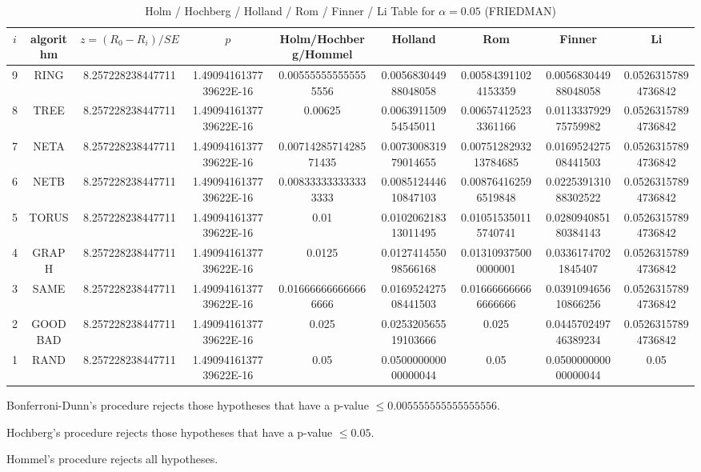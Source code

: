 \documentclass[a4paper,10pt]{article}
\begin{document}
\begin{landscape}
\begin{table}[!htp]
\begin{tabular}{
|r|r|r|r|r|r|r|r|r|r|r|}
\end{tabular}
\end{table}

\newpage

\begin{table}[!htp]
\centering\scriptsize
\caption{Holm / Hochberg / Holland / Rom / Finner / Li Table for $\alpha=0.05$ (FRIEDMAN)}
\begin{tabular}{ccccccccc}
$i$&algorithm&$z=(R_0 - R_i)/SE$&$p$&Holm/Hochberg/Hommel&Holland&Rom&Finner&Li\\
\hline
9& RING&8.257228238447711&1.4909416137739622E-16&0.005555555555555556&0.005683044988048058&0.005843911024153359&0.005683044988048058&0.05263157894736842\\
8& TREE&8.257228238447711&1.4909416137739622E-16&0.00625&0.006391150954545011&0.006574125233361166&0.011333792975759982&0.05263157894736842\\
7& NETA&8.257228238447711&1.4909416137739622E-16&0.0071428571428571435&0.007300831979014655&0.0075128293213784685&0.016952427508441503&0.05263157894736842\\
6& NETB&8.257228238447711&1.4909416137739622E-16&0.008333333333333333&0.008512444610847103&0.008764162596519848&0.022539131088302522&0.05263157894736842\\
5& TORUS&8.257228238447711&1.4909416137739622E-16&0.01&0.010206218313011495&0.010515350115740741&0.028094085180384143&0.05263157894736842\\
4& GRAPH&8.257228238447711&1.4909416137739622E-16&0.0125&0.012741455098566168&0.013109375000000001&0.03361747021845407&0.05263157894736842\\
3& SAME&8.257228238447711&1.4909416137739622E-16&0.016666666666666666&0.016952427508441503&0.016666666666666666&0.039109465610866256&0.05263157894736842\\
2& GOODBAD&8.257228238447711&1.4909416137739622E-16&0.025&0.025320565519103666&0.025&0.044570249746389234&0.05263157894736842\\
1& RAND&8.257228238447711&1.4909416137739622E-16&0.05&0.050000000000000044&0.05&0.050000000000000044&0.05\\
\hline
\end{tabular}
\end{table}
Bonferroni-Dunn's procedure rejects those hypotheses that have a p-value $\le0.005555555555555556$.


Hochberg's procedure rejects those hypotheses that have a p-value $\le0.05$.


Hommel's procedure rejects all hypotheses.



\end{landscape}
\end{document}
